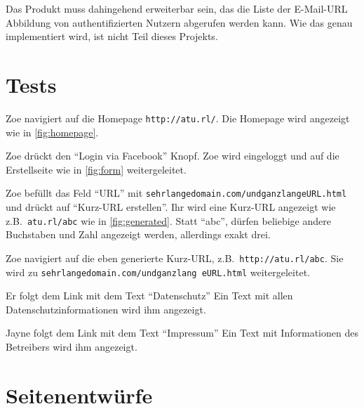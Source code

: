 \documentclass[parskip=full,11pt,twoside]{scrartcl}
\begin{document}

Das Produkt muss dahingehend erweiterbar sein,
das die Liste der E-Mail-URL Abbildung von authentifizierten Nutzern
abgerufen werden kann.
Wie das genau implementiert wird, ist nicht Teil dieses Projekts.

\section{Tests}


{Zoe navigiert auf die Homepage \texttt{http://atu.rl/}.}
{Die Homepage wird angezeigt wie in \cref{fig:homepage}.}

%
{Zoe drückt den \enquote{Login via Facebook} Knopf.}%
{Zoe wird eingeloggt und auf die Erstellseite wie in \cref{fig:form} weitergeleitet.}

\teststep{}
{Zoe befüllt das Feld \enquote{URL} mit \texttt{sehrlangedomain.com/undganzlangeURL.html} und drückt auf \enquote{Kurz-URL erstellen}.}%
{Ihr wird eine Kurz-URL angezeigt wie z.B.\ \texttt{atu.rl/abc}
 wie in \cref{fig:generated}.
 Statt \enquote{abc}, dürfen beliebige andere Buchstaben und Zahl angezeigt werden, allerdings exakt drei.}

\teststep{}
{Zoe navigiert auf die eben generierte Kurz-URL, z.B.\ \texttt{http://atu.rl/abc}.}
{Sie wird zu \texttt{sehrlangedomain.com/undganzlang  eURL.html} weitergeleitet.}


{Er folgt dem Link mit dem Text \enquote{Datenschutz}}
{Ein Text mit allen Datenschutzinformationen wird ihm angezeigt.}

\teststep{}
{Jayne folgt dem Link mit dem Text \enquote{Impressum}}
{Ein Text mit Informationen des Betreibers wird ihm angezeigt.}

\pagebreak
\appendix

\section{Seitenentwürfe}

\end{document}
